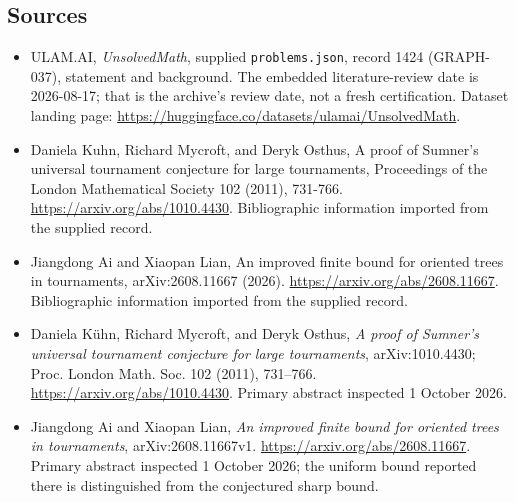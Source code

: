 \documentclass[11pt,a4paper]{article}
\begin{document}
\subsection{Sources}

{\small

\begin{itemize}

\item[\hypertarget{source:1424:1}{S1}] ULAM.AI, \emph{UnsolvedMath}, supplied \texttt{problems.json}, record 1424 (GRAPH-037), statement and background. The embedded literature-review date is 2026-08-17; that is the archive’s review date, not a fresh certification. Dataset landing page: \url{https://huggingface.co/datasets/ulamai/UnsolvedMath}.

\item[\hypertarget{source:1424:2}{S2}] Daniela Kuhn, Richard Mycroft, and Deryk Osthus, A proof of Sumner's universal tournament conjecture for large tournaments, Proceedings of the London Mathematical Society 102 (2011), 731-766. \url{https://arxiv.org/abs/1010.4430}. Bibliographic information imported from the supplied record.

\item[\hypertarget{source:1424:3}{S3}] Jiangdong Ai and Xiaopan Lian, An improved finite bound for oriented trees in tournaments, arXiv:2608.11667 (2026). \url{https://arxiv.org/abs/2608.11667}. Bibliographic information imported from the supplied record.


\item[E1] Daniela K\"uhn, Richard Mycroft, and Deryk
Osthus, \emph{A proof of Sumner's universal tournament conjecture for
large tournaments}, arXiv:1010.4430; Proc. London Math. Soc. 102 (2011),
731--766. \url{https://arxiv.org/abs/1010.4430}.
Primary abstract inspected 1 October 2026.
\item[E2] Jiangdong Ai and Xiaopan Lian, \emph{An improved finite
bound for oriented trees in tournaments}, arXiv:2608.11667v1.
\url{https://arxiv.org/abs/2608.11667}. Primary abstract inspected
1 October 2026; the uniform bound reported there is distinguished from
the conjectured sharp bound.

\end{itemize}

}

\label{end:1424}
\end{document}
